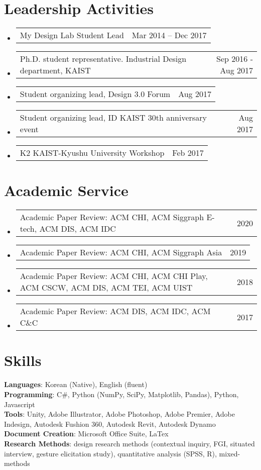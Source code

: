 \documentclass[letterpaper,11pt]{article} %
\makeatletter
\newcommand{\CVSubSubheading}[2]{
    \item
    \begin{tabular*}{0.97\textwidth}{l@{\extracolsep{\fill}}r}
      \small{#1} & #2 \\
    \end{tabular*}\vspace{-7pt}
}
\newcommand{\CVSubHeadingListStart}{\begin{itemize}[leftmargin=0.5cm, label={}]}
\newcommand{\CVSubHeadingListEnd}{\end{itemize}}
\makeatother
\begin{document}
\section{Leadership Activities}
  \CVSubHeadingListStart
    \CVSubSubheading
      {My Design Lab Student Lead}{Mar 2014 -- Dec 2017}
    \CVSubSubheading
      {Ph.D. student representative. Industrial Design department, KAIST}{Sep 2016 - Aug 2017}
    \CVSubSubheading
      {Student organizing lead, Design 3.0 Forum}{Aug 2017}
    \CVSubSubheading
      {Student organizing lead, ID KAIST 30th anniversary event}{Aug 2017}
    \CVSubSubheading
      {K2 KAIST-Kyushu University Workshop}{Feb 2017}
  \CVSubHeadingListEnd

\section{Academic Service}
  \CVSubHeadingListStart
    \CVSubSubheading
      {Academic Paper Review: ACM CHI, ACM Siggraph E-tech, ACM DIS, ACM IDC}{2020}
    \CVSubSubheading
      {Academic Paper Review: ACM CHI, ACM Siggraph Asia}{2019}
    \CVSubSubheading
      {Academic Paper Review: ACM CHI, ACM CHI Play, ACM CSCW, ACM DIS, ACM TEI, ACM UIST}{2018}
    \CVSubSubheading
      {Academic Paper Review: ACM DIS, ACM IDC, ACM C\&C}{2017}
  \CVSubHeadingListEnd

\begin{comment}
This section is compressed from the various skills sections that Euro CV
recommends.
\end{comment}

\section{Skills}
 \begin{itemize}[leftmargin=0.5cm, label={}]
    \small{\item{
     \textbf{Languages}{: Korean (Native), English (fluent)} \\
     \textbf{Programming}{: C\#, Python (NumPy, SciPy, Matplotlib, Pandas), Python, Javascript} \\
     \textbf{Tools}{: Unity, Adobe Illustrator, Adobe Photoshop, Adobe Premier, Adobe Indesign, Autodesk Fushion 360, Autodesk Revit, Autodesk Dynamo} \\
     \textbf{Document Creation}{: Microsoft Office Suite, LaTex} \\
     \textbf{Research Methods}{: design research methods (contextual inquiry, FGI, situated interview, gesture elicitation study), quantitative analysis (SPSS, R), mixed-methods} \\
    }}
 \end{itemize}
    
\end{document}
